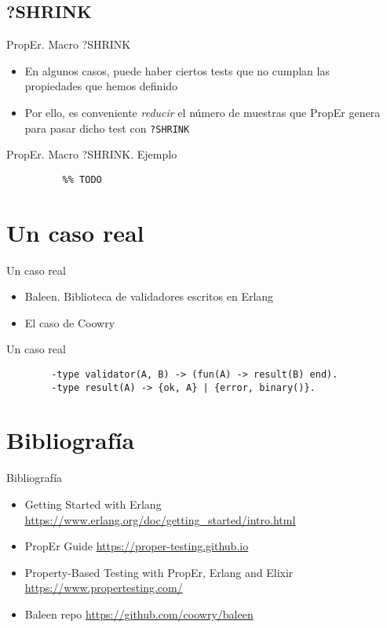 \documentclass{beamer}
\begin{document}
    \subsection{?SHRINK}
      \begin{frame}{PropEr. Macro ?SHRINK}
        \begin{itemize}
          \item En algunos casos, puede haber ciertos tests que no cumplan las\\
          propiedades que hemos definido
          \item Por ello, es conveniente \textit{reducir} el número de muestras
          que PropEr genera para pasar dicho test con \texttt{?SHRINK}
        \end{itemize}
      \end{frame}

      \begin{frame}[fragile]{PropEr. Macro ?SHRINK. Ejemplo}
        \begin{verbatim}
          %% TODO
        \end{verbatim}
      \end{frame}

  \section{Un caso real}
    \begin{frame}{Un caso real}
      \begin{itemize}
        \item Baleen. Biblioteca de validadores escritos en Erlang
        \item El caso de Coowry
      \end{itemize}
    \end{frame}

    \begin{frame}[fragile]{Un caso real}
      \begin{verbatim}
        -type validator(A, B) -> (fun(A) -> result(B) end).
        -type result(A) -> {ok, A} | {error, binary()}.
      \end{verbatim}
    \end{frame}

  \section{Bibliografía}
    \begin{frame}{Bibliografía}
      \begin{itemize}
        \item Getting Started with Erlang \url{https://www.erlang.org/doc/getting_started/intro.html}
        \item PropEr Guide \url{https://proper-testing.github.io}
        \item Property-Based Testing with PropEr, Erlang and Elixir \url{https://www.propertesting.com/}
        \item Baleen repo \url{https://github.com/coowry/baleen}
      \end{itemize}
    \end{frame}
\end{document}
